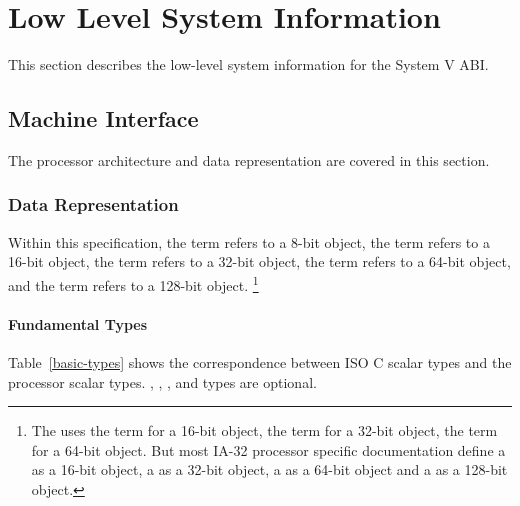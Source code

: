 \chapter{Low Level System Information}

This section describes the low-level system information for the
\xARCH System V ABI.

\section{Machine Interface}

The \xARCH processor architecture and data representation are covered in
this section.

\subsection{Data Representation}
\label{data_representation}

Within this specification, the term \emph{\textindex{\byte{}}} refers to
a 8-bit object, the term \emph{\textindex{\twobyte{}}} refers to a 16-bit
object, the term \emph{\textindex{\fourbyte{}}} refers to a 32-bit
object, the term \emph{\textindex{\eightbyte{}}} refers to a 64-bit
object, and the term \emph{\textindex{\sixteenbyte{}}} refers to a
128-bit object.%
\footnote{The \intelabi uses the term \emph{} for
  a 16-bit object, the term \emph{} for a 32-bit
  object, the term \emph{} for a 64-bit object.  But
  most IA-32 processor specific documentation define a
  \emph{} as a 16-bit object, a
  \emph{} as a 32-bit object, a
  \emph{} as a 64-bit object and a
  \emph{} as a 128-bit object.}

\subsubsection{Fundamental Types}

Table~\ref{basic-types} shows the correspondence between ISO C
scalar types and the processor scalar types.  ,
, ,  and  types
are optional.


